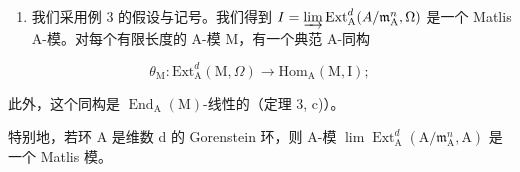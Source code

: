 \begin{enumerate}
\def\labelenumi{\arabic{enumi})}
\setcounter{enumi}{5}
\tightlist
\item
  我们采用例 3 的假设与记号。我们得到 \(I = \varinjlim \operatorname{Ext}_{\mathrm{A}}^{d}(A / \mathfrak{m}_{\mathrm{A}}^{n}, \Omega)\) 是一个 Matlis A-模。对每个有限长度的 A-模 M，有一个典范 A-同构
\end{enumerate}

\[
\theta_ {\mathrm{M}}: \mathrm{Ext} _ {\mathrm{A}} ^ {d} (\mathrm{M}, \Omega) \longrightarrow \mathrm{Hom} _ {\mathrm{A}} (\mathrm{M}, \mathrm{I});
\]

此外，这个同构是 \(\operatorname{End}_{\mathrm{A}}(\mathrm{M})\)-线性的（定理 3, c)）。

特别地，若环 A 是维数 d 的 Gorenstein 环，则 A-模 \(\lim\operatorname{Ext}_{\mathrm{A}}^{d}(\mathrm{A}/\mathfrak{m}_{\mathrm{A}}^{n},\mathrm{A})\) 是一个 Matlis 模。

